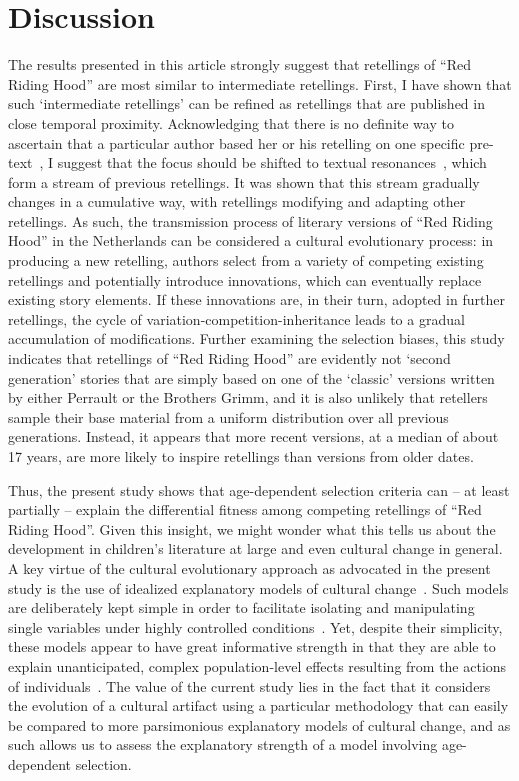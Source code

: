 \section{Discussion}\label{sec:discussion}

The results presented in this article strongly suggest that retellings of ``Red Riding Hood'' are most similar to intermediate retellings. First, I have shown that such `intermediate retellings' can be refined as retellings that are published in close temporal proximity. Acknowledging that there is no definite way to ascertain that a particular author based her or his retelling on one specific pre-text~\autocite{stephens_mccallum}, I suggest that the focus should be shifted to textual resonances~\autocite[Cf.][]{frank:2010}, which form a stream of previous retellings. It was shown that this stream gradually changes in a cumulative way, with retellings modifying and adapting other retellings. As such, the transmission process of literary versions of ``Red Riding Hood'' in the Netherlands can be considered a cultural evolutionary process: in producing a new retelling, authors select from a variety of competing existing retellings and potentially introduce innovations, which can eventually replace existing story elements. If these innovations are, in their turn, adopted in further retellings, the cycle of variation-competition-inheritance leads to a gradual accumulation of modifications. Further examining the selection biases, this study indicates that retellings of ``Red Riding Hood'' are evidently not `second generation' stories that are simply based on one of the `classic' versions written by either Perrault or the Brothers Grimm, and it is also unlikely that retellers sample their base material from a uniform distribution over all previous generations. Instead, it appears that more recent versions, at a median of about 17 years, are more likely to inspire retellings than versions from older dates. 

Thus, the present study shows that age-dependent selection criteria can -- at least partially -- explain the differential fitness among competing retellings of ``Red Riding Hood''. Given this insight, we might wonder what this tells us about the development in children's literature at large and even cultural change in general. A key virtue of the cultural evolutionary approach as advocated in the present study is the use of idealized explanatory models of cultural change~\autocite[Cf.\ e.g.][]{mesoudi:2011,boyd_richerson:2005,lewens:2015}. Such models are deliberately kept simple in order to facilitate isolating and manipulating single variables under highly controlled conditions~\autocite{mesoudi:2011}. Yet, despite their simplicity, these models appear to have great informative strength in that they are able to explain unanticipated, complex population-level effects resulting from the actions of individuals~\autocite{mcelreath2005,lewens:2015}. The value of the current study lies in the fact that it considers the evolution of a cultural artifact using a particular methodology that can easily be compared to more parsimonious explanatory models of cultural change, and as such allows us to assess the explanatory strength of a model involving age-dependent selection. 

